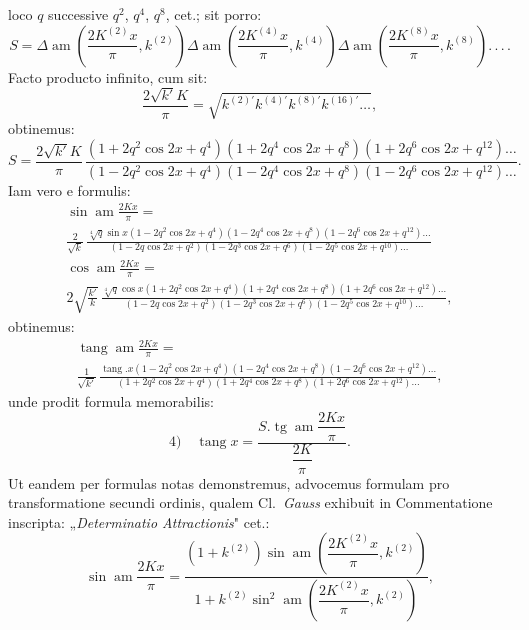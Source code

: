 \documentclass{article}
\begin{document}
loco $q$ successive $q^{2}$, $q^{4}$, $q^{8}$, cet.; sit porro:
\[
S=\Delta\operatorname{am}\left(\frac{2K^{(2)}x}{\pi},k^{(2)}\right)\Delta\operatorname{am}\left(\frac{2K^{(4)}x}{\pi},k^{(4)}\right)\Delta\operatorname{am}\left(\frac{2K^{(8)}x}{\pi},k^{(8)}\right).\,.\,.\,.
\]
Facto producto infinito, cum sit:
\[
\frac{2\sqrt{k'}K}{\pi}=\sqrt{k^{(2)\prime}k^{(4)\prime}k^{(8)\prime}k^{(16)\prime}\ldots},
\]
obtinemus:
\[
S=\frac{2\sqrt{k'}K}{\pi}\,\frac{(1+2q^{2}\cos 2x+q^{4})(1+2q^{4}\cos 2x+q^{8})(1+2q^{6}\cos 2x+q^{12})\ldots}{(1-2q^{2}\cos 2x+q^{4})(1-2q^{4}\cos 2x+q^{8})(1-2q^{6}\cos 2x+q^{12})\ldots}.
\]
Iam vero e formulis:
\[
\begin{gathered}
\sin\operatorname{am}\frac{2Kx}{\pi}=
\\[1ex]
\frac{2}{\sqrt{k}}\,\frac{\sqrt[4]{q}\sin x(1-2q^{2}\cos 2x+q^{4})(1-2q^{4}\cos 2x+q^{8})(1-2q^{6}\cos 2x+q^{12})\ldots}{(1-2q\cos 2x+q^{2})(1-2q^{3}\cos 2x+q^{6})(1-2q^{5}\cos 2x+q^{10})\ldots}
\\[2ex]
\cos\operatorname{am}\frac{2Kx}{\pi}=
\\[1ex]
2\sqrt{\frac{k'}{k}}\,\frac{\sqrt[4]{q}\cos x(1+2q^{2}\cos 2x+q^{4})(1+2q^{4}\cos 2x+q^{8})(1+2q^{6}\cos 2x+q^{12})\ldots}{(1-2q\cos 2x+q^{2})(1-2q^{3}\cos 2x+q^{6})(1-2q^{5}\cos 2x+q^{10})\ldots},
\end{gathered}
\]
obtinemus:
\[
\begin{gathered}
\operatorname{tang}\operatorname{am}\frac{2Kx}{\pi}=
\\[1ex]
\frac{1}{\sqrt{k'}}\,\frac{\operatorname{tang}.x(1-2q^{2}\cos 2x+q^{4})(1-2q^{4}\cos 2x+q^{8})(1-2q^{6}\cos 2x+q^{12})\ldots}{(1+2q^{2}\cos 2x+q^{4})(1+2q^{4}\cos 2x+q^{8})(1+2q^{6}\cos 2x+q^{12})\ldots},
\end{gathered}
\]
unde prodit formula memorabilis:
\[
\text{4)}\quad\operatorname{tang}x=\frac{S.\operatorname{tg}\operatorname{am}\dfrac{2Kx}{\pi}}{\dfrac{2K}{\pi}}.
\]
Ut eandem per formulas notas demonstremus, advocemus formulam pro transformatione secundi ordinis, qualem Cl.\ \emph{Gauss} exhibuit in Commentatione inscripta: „\emph{Determinatio Attractionis}" cet.:
\[
\sin\operatorname{am}\frac{2Kx}{\pi}=\frac{(1+k^{(2)})\sin\operatorname{am}\left(\dfrac{2K^{(2)}x}{\pi},k^{(2)}\right)}{1+k^{(2)}\sin^{2}\operatorname{am}\left(\dfrac{2K^{(2)}x}{\pi},k^{(2)}\right)},
\]
\end{document}
